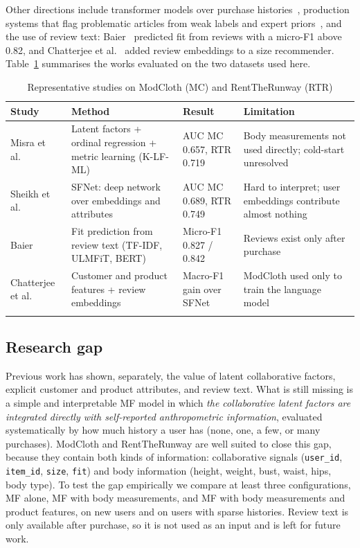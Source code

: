 Other directions include transformer models over purchase histories~\cite{eshel2021presize}, production systems that flag problematic articles from weak labels and expert priors~\cite{nestler2021sizeflags}, and the use of review text: Baier~\cite{baier2019reviews} predicted fit from reviews with a micro-F1 above 0.82, and Chatterjee et al.~\cite{chatterjee2022reviews} added review embeddings to a size recommender. Table~\ref{tab:related} summarises the works evaluated on the two datasets used here.

\begin{table}[h]
\caption{Representative studies on ModCloth (MC) and RentTheRunway (RTR)}\label{tab:related}
\begin{tabular*}{\textwidth}{@{\extracolsep\fill}p{2.1cm}p{3.6cm}p{2.0cm}p{3.6cm}}
\toprule
Study & Method & Result & Limitation \\
\midrule
Misra et al.~\cite{misra2018fit} & Latent factors + ordinal regression + metric learning (K-LF-ML) & AUC MC 0.657, RTR 0.719 & Body measurements not used directly; cold-start unresolved \\
Sheikh et al.~\cite{sheikh2019sfnet} & SFNet: deep network over embeddings and attributes & AUC MC 0.689, RTR 0.749 & Hard to interpret; user embeddings contribute almost nothing \\
Baier~\cite{baier2019reviews} & Fit prediction from review text (TF-IDF, ULMFiT, BERT) & Micro-F1 0.827 / 0.842 & Reviews exist only after purchase \\
Chatterjee et al.~\cite{chatterjee2022reviews} & Customer and product features + review embeddings & Macro-F1 gain over SFNet & ModCloth used only to train the language model \\
\botrule
\end{tabular*}
\end{table}

\subsection{Research gap}
Previous work has shown, separately, the value of latent collaborative factors, explicit customer and product attributes, and review text. What is still missing is a simple and interpretable MF model in which \emph{the collaborative latent factors are integrated directly with self-reported anthropometric information}, evaluated systematically by how much history a user has (none, one, a few, or many purchases). ModCloth and RentTheRunway are well suited to close this gap, because they contain both kinds of information: collaborative signals (\texttt{user\_id}, \texttt{item\_id}, \texttt{size}, \texttt{fit}) and body information (height, weight, bust, waist, hips, body type). To test the gap empirically we compare at least three configurations, MF alone, MF with body measurements, and MF with body measurements and product features, on new users and on users with sparse histories. Review text is only available after purchase, so it is not used as an input and is left for future work.

